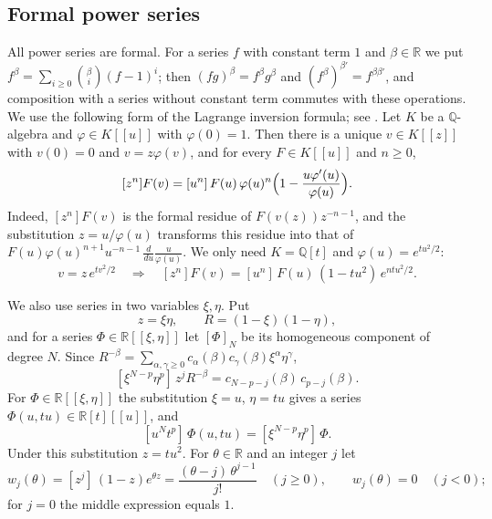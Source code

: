 \documentclass[11pt]{amsart}
\theoremstyle{definition}
\theoremstyle{remark}
\numberwithin{equation}{section}
\begin{document}
\subsection{Formal power series}\label{sec:series}
All power series are formal. For a series $f$ with constant term $1$ and $\beta\in\mathbb{R}$ we put $f^\beta=\sum_{i\ge0}\binom{\beta}{i}(f-1)^i$; then $(fg)^\beta=f^\beta g^\beta$ and $(f^\beta)^{\beta'}=f^{\beta\beta'}$, and composition with a series without constant term commutes with these operations. We use the following form of the Lagrange inversion formula; see \cite[Section~5.4]{Sta99}. Let $K$ be a $\mathbb{Q}$-algebra and $\varphi\in K[[u]]$ with $\varphi(0)=1$. Then there is a unique $v\in K[[z]]$ with $v(0)=0$ and $v=z\varphi(v)$, and for every $F\in K[[u]]$ and $n\ge0$,
\[
[z^n]F(v)=[u^n]\,F(u)\,\varphi(u)^n\Bigl(1-\frac{u\varphi'(u)}{\varphi(u)}\Bigr).
\]
Indeed, $[z^n]F(v)$ is the formal residue of $F(v(z))z^{-n-1}$, and the substitution $z=u/\varphi(u)$ transforms this residue into that of $F(u)\varphi(u)^{n+1}u^{-n-1}\,\frac{d}{du}\frac{u}{\varphi(u)}$. We only need $K=\mathbb{Q}[t]$ and $\varphi(u)=e^{tu^2/2}$:
\begin{equation}\label{eq:lagrange}
v=z\,e^{tv^2/2}\quad\Longrightarrow\quad[z^n]F(v)=[u^n]\,F(u)\,(1-tu^2)\,e^{ntu^2/2}.
\end{equation}

We also use series in two variables $\xi,\eta$. Put
\[
z=\xi\eta,\qquad R=(1-\xi)(1-\eta),
\]
and for a series $\Phi\in\mathbb{R}[[\xi,\eta]]$ let $[\Phi]_N$ be its homogeneous component of degree $N$. Since $R^{-\beta}=\sum_{\alpha,\gamma\ge0}c_\alpha(\beta)c_\gamma(\beta)\xi^\alpha\eta^\gamma$,
\begin{equation}\label{eq:extract}
[\xi^{N-p}\eta^p]\,z^jR^{-\beta}=c_{N-p-j}(\beta)\,c_{p-j}(\beta).
\end{equation}
For $\Phi\in\mathbb{R}[[\xi,\eta]]$ the substitution $\xi=u$, $\eta=tu$ gives a series $\Phi(u,tu)\in\mathbb{R}[t][[u]]$, and
\begin{equation}\label{eq:dictionary}
[u^Nt^p]\,\Phi(u,tu)=[\xi^{N-p}\eta^p]\,\Phi.
\end{equation}
Under this substitution $z=tu^2$. For $\theta\in\mathbb{R}$ and an integer $j$ let
\begin{equation}\label{eq:w}
w_j(\theta)=[z^j]\,(1-z)e^{\theta z}=\frac{(\theta-j)\,\theta^{j-1}}{j!}\quad(j\ge0),\qquad w_j(\theta)=0\quad(j<0);
\end{equation}
for $j=0$ the middle expression equals $1$.
\end{document}
